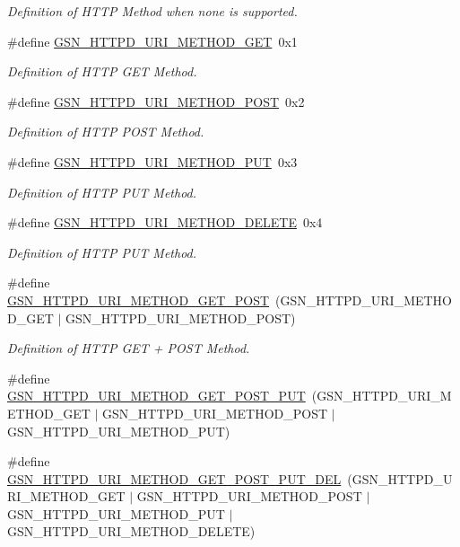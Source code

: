 \begin{DoxyCompactItemize}
\begin{DoxyCompactList}\small\item\em Definition of HTTP Method when none is supported. \end{DoxyCompactList}\item 
\#define \hyperlink{a00666_gacd507c9947ef6c72439a7a6b334ba992}{GSN\_\-HTTPD\_\-URI\_\-METHOD\_\-GET}~0x1
\begin{DoxyCompactList}\small\item\em Definition of HTTP GET Method. \end{DoxyCompactList}\item 
\#define \hyperlink{a00666_gafcfe6d0dabbefac822f05864c5b15aa6}{GSN\_\-HTTPD\_\-URI\_\-METHOD\_\-POST}~0x2
\begin{DoxyCompactList}\small\item\em Definition of HTTP POST Method. \end{DoxyCompactList}\item 
\#define \hyperlink{a00666_ga770c378292f790cfba51990b41cf58dc}{GSN\_\-HTTPD\_\-URI\_\-METHOD\_\-PUT}~0x3
\begin{DoxyCompactList}\small\item\em Definition of HTTP PUT Method. \end{DoxyCompactList}\item 
\#define \hyperlink{a00666_ga2c713aa7f2f3beef019826bca59fae7a}{GSN\_\-HTTPD\_\-URI\_\-METHOD\_\-DELETE}~0x4
\begin{DoxyCompactList}\small\item\em Definition of HTTP PUT Method. \end{DoxyCompactList}\item 
\#define \hyperlink{a00666_ga02224e5a5226487aecd6d50f7812ed07}{GSN\_\-HTTPD\_\-URI\_\-METHOD\_\-GET\_\-POST}~(GSN\_\-HTTPD\_\-URI\_\-METHOD\_\-GET $|$ GSN\_\-HTTPD\_\-URI\_\-METHOD\_\-POST)
\begin{DoxyCompactList}\small\item\em Definition of HTTP GET + POST Method. \end{DoxyCompactList}\item 
\#define \hyperlink{a00508_ad0bbd7c790ff09d8eabeaf3cfb5d01f2}{GSN\_\-HTTPD\_\-URI\_\-METHOD\_\-GET\_\-POST\_\-PUT}~(GSN\_\-HTTPD\_\-URI\_\-METHOD\_\-GET $|$ GSN\_\-HTTPD\_\-URI\_\-METHOD\_\-POST $|$ GSN\_\-HTTPD\_\-URI\_\-METHOD\_\-PUT)
\item 
\#define \hyperlink{a00508_a06d9ae66ee299f4e7a7100d841ae1f63}{GSN\_\-HTTPD\_\-URI\_\-METHOD\_\-GET\_\-POST\_\-PUT\_\-DEL}~(GSN\_\-HTTPD\_\-URI\_\-METHOD\_\-GET $|$ GSN\_\-HTTPD\_\-URI\_\-METHOD\_\-POST $|$ GSN\_\-HTTPD\_\-URI\_\-METHOD\_\-PUT $|$ GSN\_\-HTTPD\_\-URI\_\-METHOD\_\-DELETE)

\end{DoxyCompactItemize}
